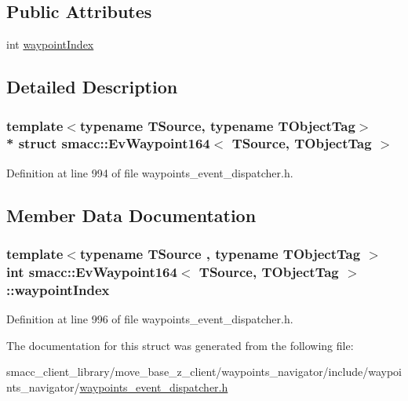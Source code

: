 \subsection*{Public Attributes}
\begin{DoxyCompactItemize}
\item 
int \hyperlink{structsmacc_1_1EvWaypoint164_afd8286ed57c3483cb6aadffa797fe657}{waypoint\+Index}
\end{DoxyCompactItemize}


\subsection{Detailed Description}
\subsubsection*{template$<$typename T\+Source, typename T\+Object\+Tag$>$\\*
struct smacc\+::\+Ev\+Waypoint164$<$ T\+Source, T\+Object\+Tag $>$}



Definition at line 994 of file waypoints\+\_\+event\+\_\+dispatcher.\+h.



\subsection{Member Data Documentation}
\subsubsection[{\texorpdfstring{waypoint\+Index}{waypointIndex}}]{\setlength{\rightskip}{0pt plus 5cm}template$<$typename T\+Source , typename T\+Object\+Tag $>$ int {\bf smacc\+::\+Ev\+Waypoint164}$<$ T\+Source, T\+Object\+Tag $>$\+::waypoint\+Index}\hypertarget{structsmacc_1_1EvWaypoint164_afd8286ed57c3483cb6aadffa797fe657}{}\label{structsmacc_1_1EvWaypoint164_afd8286ed57c3483cb6aadffa797fe657}


Definition at line 996 of file waypoints\+\_\+event\+\_\+dispatcher.\+h.



The documentation for this struct was generated from the following file\+:\begin{DoxyCompactItemize}
\item 
smacc\+\_\+client\+\_\+library/move\+\_\+base\+\_\+z\+\_\+client/waypoints\+\_\+navigator/include/waypoints\+\_\+navigator/\hyperlink{waypoints__event__dispatcher_8h}{waypoints\+\_\+event\+\_\+dispatcher.\+h}\end{DoxyCompactItemize}
